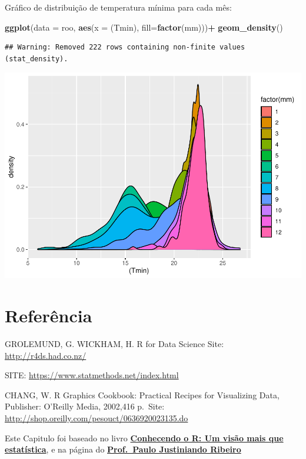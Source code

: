 \documentclass[
]{book}
\newenvironment{Shaded}{\begin{snugshade}}{\end{snugshade}}
\newcommand{\DataTypeTok}[1]{\textcolor[rgb]{0.13,0.29,0.53}{#1}}
\newcommand{\KeywordTok}[1]{\textcolor[rgb]{0.13,0.29,0.53}{\textbf{#1}}}
\newcommand{\NormalTok}[1]{#1}
\newcommand{\OperatorTok}[1]{\textcolor[rgb]{0.81,0.36,0.00}{\textbf{#1}}}
\newcommand{\StringTok}[1]{\textcolor[rgb]{0.31,0.60,0.02}{#1}}
\begin{document}
Gráfico de distribuição de temperatura mínima para cada mês:

\begin{Shaded}
\begin{Highlighting}[]
\KeywordTok{ggplot}\NormalTok{(}\DataTypeTok{data =}\NormalTok{ roo, }\KeywordTok{aes}\NormalTok{(}\DataTypeTok{x =}\NormalTok{ (Tmin), }\DataTypeTok{fill=}\KeywordTok{factor}\NormalTok{(mm)))}\OperatorTok{+}
\StringTok{  }\KeywordTok{geom_density}\NormalTok{() }
\end{Highlighting}
\end{Shaded}

\begin{verbatim}
## Warning: Removed 222 rows containing non-finite values (stat_density).
\end{verbatim}

\includegraphics{TudodoR_files/figure-latex/unnamed-chunk-243-1.pdf}

\hypertarget{referuxeancia-3}{%
\section{Referência}\label{referuxeancia-3}}

GROLEMUND, G. WICKHAM, H. R for Data Science Site: \url{http://r4ds.had.co.nz/}

SITE: \url{https://www.statmethods.net/index.html}

CHANG, W. R Graphics Cookbook: Practical Recipes for Visualizing Data, Publisher: O'Reilly Media, 2002,416 p.~Site: \url{http://shop.oreilly.com/pesouct/0636920023135.do}

Este Capitulo foi baseado no livro \href{https://www.editoraufv.com.br/produto/conhecendo-o-r-uma-visao-mais-que-estatistica/1109294}{\textbf{Conhecendo o R: Um visão mais que estatística}}, e na página do \href{http://www.leg.ufpr.br/~paulojus/}{\textbf{Prof.~Paulo Justiniando Ribeiro}}
\end{document}
